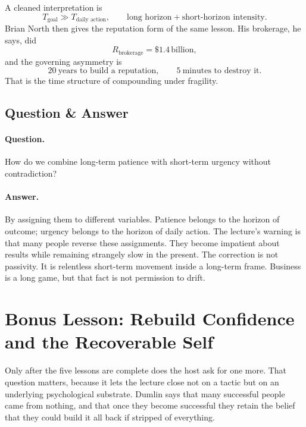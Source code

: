 A cleaned interpretation is
\begin{equation}
T_{\text{goal}} \gg T_{\text{daily action}},
\qquad
\text{long horizon} + \text{short-horizon intensity}.
\end{equation}
Brian North then gives the reputation form of the same lesson. His brokerage, he says, did
\begin{equation}
R_{\text{brokerage}} = \$1.4\,\text{billion},
\end{equation}
and the governing asymmetry is
\begin{equation}
20\ \text{years to build a reputation},
\qquad
5\ \text{minutes to destroy it}.
\end{equation}
That is the time structure of compounding under fragility.

\subsection{Question \& Answer}

\paragraph{Question.} How do we combine long-term patience with short-term urgency without contradiction?

\paragraph{Answer.} By assigning them to different variables. Patience belongs to the horizon of outcome; urgency belongs to the horizon of daily action. The lecture's warning is that many people reverse these assignments. They become impatient about results while remaining strangely slow in the present. The correction is not passivity. It is relentless short-term movement inside a long-term frame. Business is a long game, but that fact is not permission to drift.

\section{Bonus Lesson: Rebuild Confidence and the Recoverable Self}

Only after the five lessons are complete does the host ask for one more. That question matters, because it lets the lecture close not on a tactic but on an underlying psychological substrate. Dumlin says that many successful people came from nothing, and that once they become successful they retain the belief that they could build it all back if stripped of everything.

